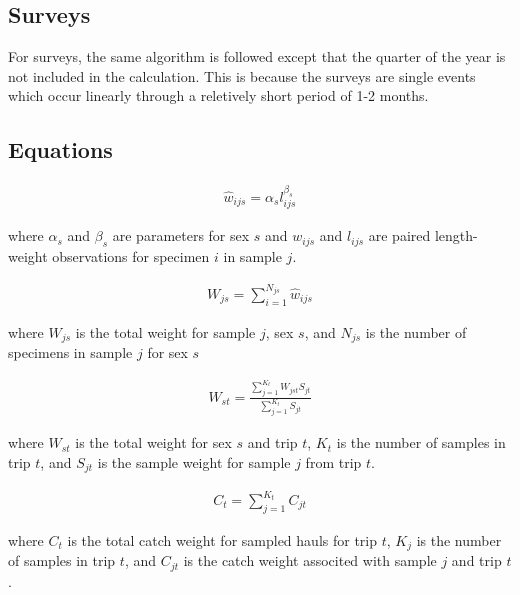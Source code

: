 \documentclass[11pt]{book}\usepackage[]{graphicx}\usepackage[]{color}
\begin{document}
\subsection{Surveys}
For surveys, the same algorithm is followed except that the quarter of the year is not included in the calculation. This is because the surveys are
single events which occur linearly through a reletively short period of 1-2 months.

\subsection{Equations}

\begin{align} \label{eq:lw}
\hat{w}_{ijs}=\alpha_sl_{ijs}^{\beta_s}
\end{align}
\begin{addmargin}[3em]{1em}
where $\alpha_s$ and $\beta_s$ are parameters for sex $s$ and $w_{ijs}$ and $l_{ijs}$ are paired length-weight observations for specimen $i$ in sample $j$.
\end{addmargin}

\begin{align} \label{eq:samplewt}
W_{js}=\sum_{i=1}^{N_{js}}\hat{w}_{ijs}
\end{align}
\begin{addmargin}[3em]{1em}
where $W_{js}$ is the total weight for sample $j$, sex $s$, and $N_{js}$ is the number of specimens in sample $j$ for sex $s$
\end{addmargin}

\begin{align} \label{eq:totaltripwt}
W_{st}=\frac{\sum\limits_{j=1}^{K_t}W_{jst}S_{jt}}{\sum\limits_{j=1}^{K_t}S_{jt}}
\end{align}
\begin{addmargin}[3em]{1em}
where $W_{st}$ is the total weight for sex $s$ and trip $t$, $K_t$ is the number of samples in trip $t$, and $S_{jt}$ is the sample weight for sample $j$ from trip $t$.
\end{addmargin}

\begin{align} \label{eq:totaltripcatchwt}
C_t=\sum\limits_{j=1}^{K_t}C_{jt}
\end{align}
\begin{addmargin}[3em]{1em}
where $C_t$ is the total catch weight for sampled hauls for trip $t$, $K_j$ is the number of samples in trip $t$, and $C_{jt}$ is the catch weight associted with sample $j$ and trip $t$.
\end{addmargin}
\end{document}
